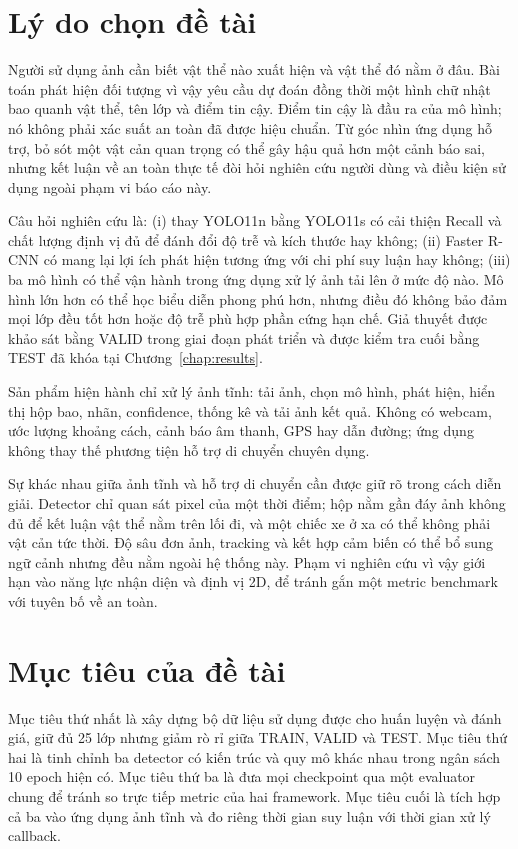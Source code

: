 \documentclass[12pt,a4paper,oneside]{report}
\begin{document}
\section{Lý do chọn đề tài}
Người sử dụng ảnh cần biết vật thể nào xuất hiện và vật thể đó nằm ở đâu. Bài toán phát hiện đối tượng vì vậy yêu cầu dự đoán đồng thời một hình chữ nhật bao quanh vật thể, tên lớp và điểm tin cậy. Điểm tin cậy là đầu ra của mô hình; nó không phải xác suất an toàn đã được hiệu chuẩn. Từ góc nhìn ứng dụng hỗ trợ, bỏ sót một vật cản quan trọng có thể gây hậu quả hơn một cảnh báo sai, nhưng kết luận về an toàn thực tế đòi hỏi nghiên cứu người dùng và điều kiện sử dụng ngoài phạm vi báo cáo này.

Câu hỏi nghiên cứu là: (i) thay YOLO11n bằng YOLO11s có cải thiện Recall và chất lượng định vị đủ để đánh đổi độ trễ và kích thước hay không; (ii) Faster R-CNN có mang lại lợi ích phát hiện tương ứng với chi phí suy luận hay không; (iii) ba mô hình có thể vận hành trong ứng dụng xử lý ảnh tải lên ở mức độ nào. Mô hình lớn hơn có thể học biểu diễn phong phú hơn, nhưng điều đó không bảo đảm mọi lớp đều tốt hơn hoặc độ trễ phù hợp phần cứng hạn chế. Giả thuyết được khảo sát bằng VALID trong giai đoạn phát triển và được kiểm tra cuối bằng TEST đã khóa tại Chương~\ref{chap:results}.

Sản phẩm hiện hành chỉ xử lý ảnh tĩnh: tải ảnh, chọn mô hình, phát hiện, hiển thị hộp bao, nhãn, confidence, thống kê và tải ảnh kết quả.  Không có webcam, ước lượng khoảng cách, cảnh báo âm thanh, GPS hay dẫn đường; ứng dụng không thay thế phương tiện hỗ trợ di chuyển chuyên dụng.

Sự khác nhau giữa ảnh tĩnh và hỗ trợ di chuyển cần được giữ rõ trong cách diễn giải. Detector chỉ quan sát pixel của một thời điểm; hộp nằm gần đáy ảnh không đủ để kết luận vật thể nằm trên lối đi, và một chiếc xe ở xa có thể không phải vật cản tức thời. Độ sâu đơn ảnh, tracking và kết hợp cảm biến có thể bổ sung ngữ cảnh nhưng đều nằm ngoài hệ thống này. Phạm vi nghiên cứu vì vậy giới hạn vào năng lực nhận diện và định vị 2D, để tránh gắn một metric benchmark với tuyên bố về an toàn.

\section{Mục tiêu của đề tài}
Mục tiêu thứ nhất là xây dựng bộ dữ liệu sử dụng được cho huấn luyện và đánh giá, giữ đủ 25 lớp nhưng giảm rò rỉ giữa TRAIN, VALID và TEST. Mục tiêu thứ hai là tinh chỉnh ba detector có kiến trúc và quy mô khác nhau trong ngân sách 10 epoch hiện có. Mục tiêu thứ ba là đưa mọi checkpoint qua một evaluator chung để tránh so trực tiếp metric của hai framework. Mục tiêu cuối là tích hợp cả ba vào ứng dụng ảnh tĩnh và đo riêng thời gian suy luận với thời gian xử lý callback.
\end{document}
